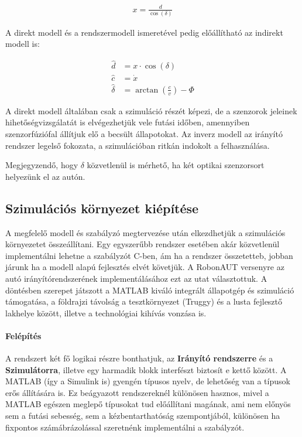 \begin{align}
    x = \frac{d}{\cos(\delta)}
\end{align}

A direkt modell és a rendszermodell ismeretével pedig előállítható az indirekt modell is:

\begin{align}
    \hat{d} &= x \cdot \cos(\delta) \\
    \hat{c} &=\dot{x} \\
    \hat{\delta} &= \arctan \left(\frac{c}{v}\right) - \Phi
\end{align}

A direkt modell általában csak a szimuláció részét képezi, de a szenzorok jeleinek hihetőségvizsgálatát is elvégezhetjük vele futási időben, amennyiben szenzorfúziófal állítjuk elő a becsült állapotokat.
Az inverz modell az irányító rendszer legelső fokozata, a szimulációban ritkán indokolt a felhasználása.

Megjegyzendő, hogy $\delta$ közvetlenül is mérhető, ha két optikai szenzorsort helyezünk el az autón.

\subsection{Szimulációs környezet kiépítése}

A megfelelő modell és szabályzó megtervezése után elkezdhetjük a szimulációs környezetet összeállítani. Egy egyszerűbb rendszer esetében akár közvetlenül implementálni lehetne a szabályzót C-ben, ám ha a rendszer összetetteb, jobban járunk ha a modell alapú fejlesztés elvét követjük. A RobonAUT versenyre az autó irányítórendszerének implementálásához ezt az utat választottuk. A döntésben szerepet játszott a MATLAB kiváló integrált állapotgép és szimuláció támogatása, a földrajzi távolság a tesztkörnyezet (Truggy) és a lusta fejlesztő lakhelye között, illetve a technológiai kihívás vonzása is.

\paragraph{Felépítés}

A rendszert két fő logikai részre bonthatjuk, az \textbf{Irányító rendszerre} és a \textbf{Szimulátorra}, illetve egy harmadik blokk interfészt biztosít e kettő között. A MATLAB (így a Simulink is) gyengén típusos nyelv, de lehetőség van a típusok erős állítására is. Ez beágyazott rendszereknél különösen hasznos, mivel a MATLAB egészen meglepő típusokat tud előállítani magának, ami nem előnyös sem a futási sebesség, sem a kézbentarthatóság szempontjából, különösen ha fixpontos számábrázolással szeretnénk implementálni a szabályzót.

